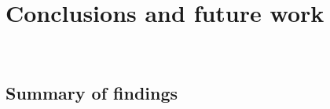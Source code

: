 \addchapheadtotoc
\chapter{Conclusions and future work}~\label{chapter:conclusion}

\section{Summary of findings}